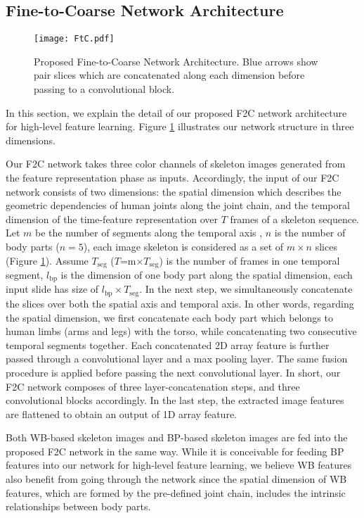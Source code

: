 \documentclass{bmvc2k}
\begin{document}
\subsection{Fine-to-Coarse Network Architecture}
\begin{figure}[t!]
	\centering
	\texttt{[image: FtC.pdf]}
	\caption{Proposed Fine-to-Coarse Network Architecture. Blue arrows show pair slices which are concatenated along each dimension before passing to a convolutional block.}
	\label{fig:hier_arch}
\end{figure}
In this section, we explain the detail of our proposed F2C network architecture for high-level feature learning. Figure \ref{fig:hier_arch} illustrates our network structure in three dimensions.

Our F2C network takes three color channels of skeleton images generated from the feature representation phase as inputs. Accordingly, the input of our F2C network consists of two dimensions: the spatial dimension which describes the geometric dependencies of human joints along the joint chain, and the temporal dimension of the time-feature representation over $T$ frames of a skeleton sequence. Let $m$ be the number of segments along the temporal axis , $n$ is the number of body parts ($n=5$), each image skeleton is considered as a set of $m \times n$ slices (Figure \ref{fig:hier_arch}). Assume $T_\textrm{seg}$ ($T$=m$\times$$T_\textrm{seg}$) is the number of frames in one temporal segment, $l_\textrm{bp}$ is the dimension of one body part along the spatial dimension, each input slide has size of $l_\textrm{bp}\times T_\textrm{seg}$. In the next step, we simultaneously concatenate the slices over both the spatial axis and temporal axis. In other words, regarding the spatial dimension, we first concatenate each body part which belongs to human limbs (arms and legs) with the torso, while concatenating two consecutive temporal segments together. Each concatenated 2D array feature is further passed through a convolutional layer and a max pooling layer. The same fusion procedure is applied before passing the next convolutional layer. In short, our F2C network composes of three layer-concatenation steps, and three convolutional blocks accordingly. In the last step, the extracted image features are flattened to obtain an output of 1D array feature.

Both WB-based skeleton images and BP-based skeleton images are fed into the proposed F2C network in the same way. While it is conceivable for feeding BP features into our network for high-level feature learning, we believe WB features also benefit from going through the network since the spatial dimension of WB features, which are formed by the pre-defined joint chain, includes the intrinsic relationships between body parts. 
\end{document}
